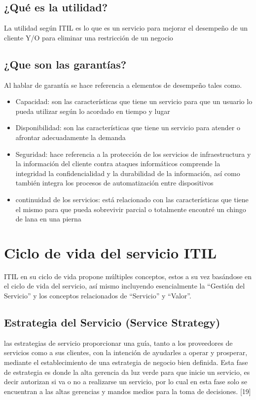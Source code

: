  \subsection{¿Qué es la utilidad?}
 La utilidad según ITIL es lo que es un servicio para mejorar el desempeño de un cliente Y/O para eliminar una restricción de un negocio
  \subsection{¿Que son las garantías?}
 Al hablar de garantía se hace referencia a elementos de desempeño tales como.
 \begin{itemize}
 	\item  Capacidad: son las características que tiene un servicio para que un usuario lo pueda utilizar según lo acordado en tiempo y lugar
 	\item Disponibilidad: son las características que tiene un servicio para atender o afrontar adecuadamente la demanda
	\item Seguridad: hace referencia a la protección de los servicios de infraestructura y la información del cliente contra ataques informáticos comprende la integridad la confidencialidad y la durabilidad de la información, así como también integra los procesos de automatización entre dispositivos
	\item continuidad de los servicios: está relacionado con las características que tiene el mismo para que pueda sobrevivir parcial o totalmente encontré un chingo de lana en una pierna
 \end{itemize}


\section{Ciclo de vida del servicio ITIL}
 
 ITIL en su ciclo de vida propone múltiples conceptos, estos a su vez  basándose en el  ciclo de vida del servicio, así mismo incluyendo esencialmente la “Gestión del Servicio” y los conceptos relacionados de “Servicio” y “Valor”. 
 \subsection{Estrategia del Servicio (Service Strategy)}
 las estrategias de servicio proporcionar una guía, tanto a los proveedores de servicios como a sus clientes, con la intención de ayudarles a operar y prosperar, mediante el establecimiento de una estrategia de negocio bien definida.
 Esta fase de estrategia es donde la alta gerencia da luz verde para que inicie un servicio, es decir autorizan si va o no a realizarse un servicio,  por lo cual  en esta fase solo se encuentran a las altas gerencias y mandos medios para la toma de decisiones. [19]
 

